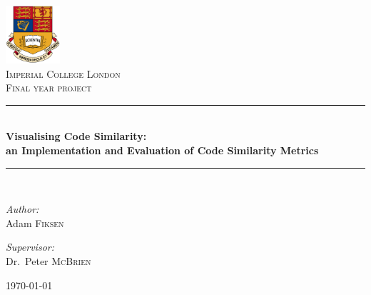 \documentclass[a4paper, 11pt, twoside]{report}
\newcommand{\HRule}{\rule{\linewidth}{0.5mm}}
\begin{document}
\begin{titlepage}
\begin{center}

\includegraphics[width=0.15\textwidth]{Figures/logo}~\\[1cm]

\textsc{\LARGE Imperial College London}\\[1.5cm]

\textsc{\Large Final year project}\\[0.5cm]

\HRule \\[0.4cm]
{ \huge \bfseries Visualising Code Similarity: \\
an Implementation and Evaluation of Code Similarity Metrics\\[0.4cm] }

\HRule \\[1.5cm]

\begin{minipage}{0.4\textwidth}
\begin{flushleft} \large
\emph{Author:}\\
Adam \textsc{Fiksen}
\end{flushleft}
\end{minipage}
\begin{minipage}{0.4\textwidth}
\begin{flushright} \large
\emph{Supervisor:} \\
Dr.~Peter \textsc{McBrien}
\end{flushright}
\end{minipage}

\vfill

{\large \today}

\end{center}
\end{titlepage}
\end{document}
